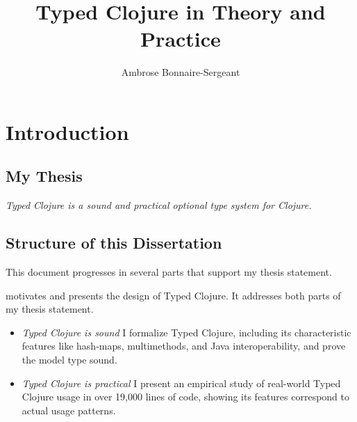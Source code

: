 \documentclass[11pt,final]{iuthesis}
\title{Typed Clojure in Theory and Practice}
\author{Ambrose Bonnaire-Sergeant}
\begin{document}
\frontmatter %

\begin{acknowledgements}
  
\end{acknowledgements}


\begin{abstract}

\end{abstract}

\maketitle
\signaturepage
\copyrightpage
\makeack
\makeabstract

\singlespacing
\tableofcontents


\doublespacing

\newpage

\mainmatter

%

\chapter{Introduction}

\section{My Thesis}

\emph{Typed Clojure is a sound and practical optional type system for Clojure.}

\section{Structure of this Dissertation}

This document progresses in several parts that support my thesis statement.

 motivates and presents the design of Typed Clojure.
It addresses both parts of my thesis statement.

\begin{itemize}
  \item \emph{Typed Clojure is sound} I formalize Typed Clojure, including
    its characteristic features like hash-maps, multimethods, and Java interoperability,
    and prove the model type sound.
  \item \emph{Typed Clojure is practical} 
      I present an empirical study of real-world Typed Clojure usage
        in over 19,000 lines of code, showing its features correspond to actual usage patterns.
\end{itemize}
\end{document}
